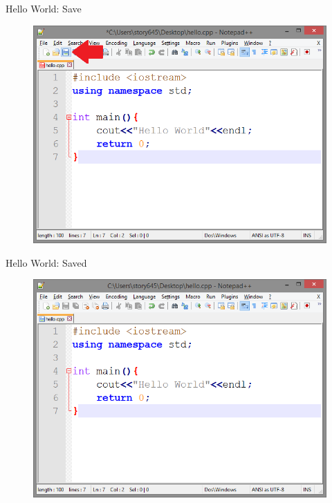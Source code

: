 \documentclass[xcolor={dvipsnames}]{beamer}
\begin{document}
\begin{frame}{Hello World: Save}
	\begin{figure}
			\includegraphics[width=1\textwidth]{save}
	\end{figure}
\end{frame}

\begin{frame}{Hello World: Saved}
	\begin{figure}
			\includegraphics[width=1\textwidth]{Saved}
	\end{figure}
\end{frame}
\end{document}
